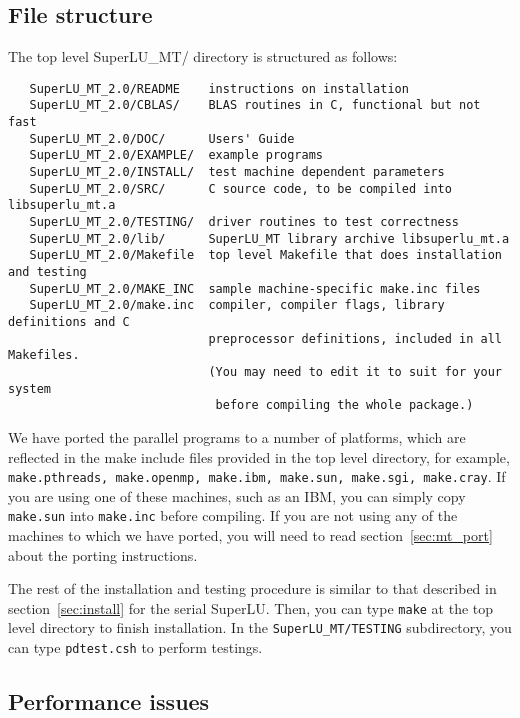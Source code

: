 \subsection{File structure}
The top level SuperLU\_MT/ directory is structured as follows:
\begin{verbatim}
   SuperLU_MT_2.0/README    instructions on installation
   SuperLU_MT_2.0/CBLAS/    BLAS routines in C, functional but not fast
   SuperLU_MT_2.0/DOC/      Users' Guide
   SuperLU_MT_2.0/EXAMPLE/  example programs
   SuperLU_MT_2.0/INSTALL/  test machine dependent parameters
   SuperLU_MT_2.0/SRC/      C source code, to be compiled into libsuperlu_mt.a
   SuperLU_MT_2.0/TESTING/  driver routines to test correctness
   SuperLU_MT_2.0/lib/      SuperLU_MT library archive libsuperlu_mt.a
   SuperLU_MT_2.0/Makefile  top level Makefile that does installation and testing
   SuperLU_MT_2.0/MAKE_INC  sample machine-specific make.inc files
   SuperLU_MT_2.0/make.inc  compiler, compiler flags, library definitions and C
                            preprocessor definitions, included in all Makefiles.
                            (You may need to edit it to suit for your system 
                             before compiling the whole package.)

\end{verbatim}

We have ported the parallel programs to a number of platforms, which are
reflected in the make include files provided in the top level directory, 
for example, {\tt make.pthreads, make.openmp, make.ibm, make.sun, make.sgi,
make.cray}. 
If you are using one of these machines, such as an IBM, you can
simply copy {\tt make.sun} into {\tt make.inc} before compiling. 
If you are not using any of the machines to which we have ported, 
you will need to read section~\ref{sec:mt_port} about the
porting instructions.

The rest of the installation and testing procedure is similar to that
described in section~\ref{sec:install} for the serial SuperLU.
Then, you can type {\tt make} at the top level directory to
finish installation. In the {\tt SuperLU\_MT/TESTING} subdirectory, you can 
type {\tt pdtest.csh} to perform testings.


\subsection{Performance issues}
\label{sec:superlu_mt_perf}

